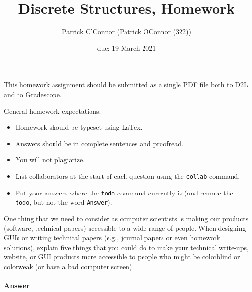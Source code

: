 \documentclass{article}
\title{Discrete Structures, Homework \hwnum}
\author{Patrick O'Connor (Patrick OConnor (322))}
\date{due: 19 March 2021}
\begin{document}
\maketitle

This homework assignment should be
submitted as a single PDF file both to D2L and to Gradescope.

General homework expectations:
\begin{itemize}
    \item Homework should be typeset using LaTex.
    \item Answers should be in complete sentences and proofread.
    \item You will not plagiarize.
    \item List collaborators at the start of each question using the \texttt{collab} command.
    \item Put your answers where the \texttt{todo} command currently is (and
        remove the \texttt{todo}, but not the word \texttt{Answer}).
\end{itemize}


 

One thing that we need to consider as computer scientists is making our products
(software, technical papers) accessible to a wide range of people. When
designing GUIs or writing technical papers (e.g., journal papers or even
homework solutions), explain five things that you could do to make your
technical write-ups, website, or GUI products more accessible to people who
might be colorblind or colorweak (or have a bad computer screen).


\paragraph{Answer}
\end{document}
